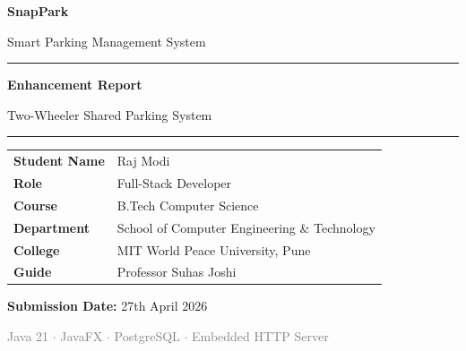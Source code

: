 \documentclass[12pt,a4paper]{article}
\begin{document}
\begin{titlepage}
    \centering
    \vspace*{2cm}
    
    {\Huge\bfseries\textcolor{snapblue}{SnapPark}\par}
    \vspace{0.3cm}
    {\Large\textcolor{snapcyan}{Smart Parking Management System}\par}
    
    \vspace{1.5cm}
    \rule{\textwidth}{1.5pt}
    \vspace{0.5cm}
    
    {\LARGE\bfseries Enhancement Report\par}
    \vspace{0.3cm}
    {\Large\textcolor{snapblue}{Two-Wheeler Shared Parking System}\par}
    
    \vspace{0.5cm}
    \rule{\textwidth}{1.5pt}
    
    \vspace{2cm}
    
    \begin{tabular}{ll}
        \textbf{Student Name}    & Raj Modi \\
        \textbf{Role}            & Full-Stack Developer \\
        \textbf{Course}          & B.Tech Computer Science \\
        \textbf{Department}      & School of Computer Engineering \& Technology \\
        \textbf{College}         & MIT World Peace University, Pune \\
        \textbf{Guide}           & Professor Suhas Joshi \\
    \end{tabular}
    
    \vspace{2cm}
    
    {\large\textbf{Submission Date:} 27th April 2026\par}
    
    \vfill
    {\small\textcolor{gray}{Java 21 $\cdot$ JavaFX $\cdot$ PostgreSQL $\cdot$ Embedded HTTP Server}\par}
\end{titlepage}
\end{document}
